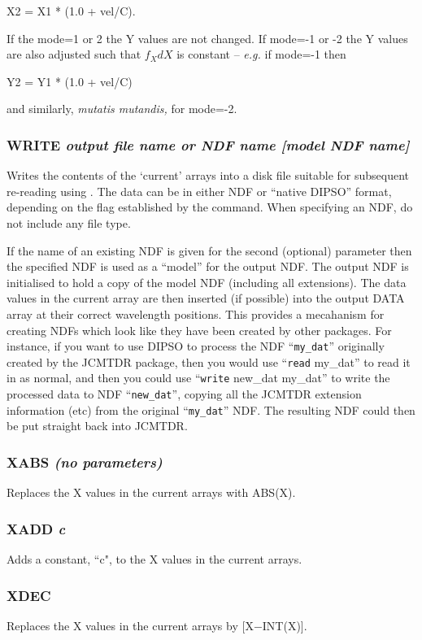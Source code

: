 \documentclass[twoside,11pt,noabs,nolof]{starlink}
\providecommand{\dipcom}[3]{\subsubsection*{\label{COM:#1}\textbf{#1} \emph{#2}}}
\begin{document}
\begin{terminalv}
X2 = X1 * (1.0 + vel/C).
\end{terminalv}

If the mode=1 or 2 the Y values are not changed. If mode=-1 or -2 the
Y values are also adjusted such that $f_{X}dX$ is constant -- \textit{e.g.} if mode=-1 then

\begin{terminalv}
Y2 = Y1 * (1.0 + vel/C)
\end{terminalv}

and similarly, \textit{mutatis mutandis,} for mode=-2.

\dipcom{WRITE}{output file name or NDF name [model NDF name]}{Write data to a disk file from the current arrays (see {\texttt{READ}})}
Writes the contents of the `current' arrays into a disk file suitable for
subsequent re-reading using .  The data can be in either NDF or ``native
DIPSO'' format, depending on the flag established by the   command.
When specifying an NDF, do not include any file type.

If the name of an existing NDF is given for the second (optional) parameter
then the specified NDF is used as a ``model'' for the output NDF. The
output NDF is initialised to hold a copy of the model NDF (including all
extensions). The data values in the current array are then inserted (if
possible) into the output DATA array at their correct wavelength
positions. This provides a mecahanism for creating NDFs which look like
they have been created by other packages. For instance, if you want to
use DIPSO to process the NDF ``{\texttt{my\_dat}}''  originally created by the
JCMTDR package, then you would use ``{\texttt{read}  my\_dat}'' to read it in
as normal, and then you could use ``{\texttt{write}  new\_dat my\_dat}'' to
write the processed data to NDF ``{\texttt{new\_dat}}'',  copying all the
JCMTDR extension information (etc) from the original ``{\texttt{my\_dat}}''
NDF. The resulting NDF could then be put straight back into JCMTDR.

\dipcom{XABS}{(no parameters)}{Replaces X values in the current arrays with their absolute value}
Replaces the X values in the current arrays with ABS(X).

\dipcom{XADD}{c}{Adds a constant to the X values in the current arrays}
Adds a constant, ``c", to the X values in the current arrays.

\dipcom{XDEC}{}{Replaces X values in the current arrays by X-INT(X)}
Replaces the X values in the current arrays by [X$-$INT(X)].
\end{document}
